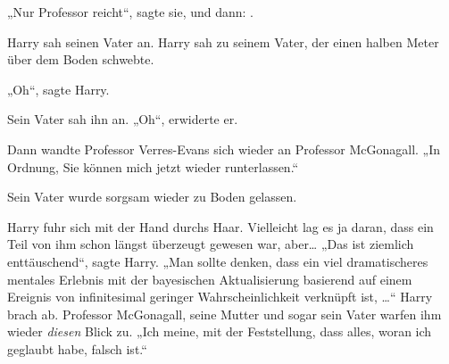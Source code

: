 „Nur Professor reicht“, sagte sie, und dann: .

Harry sah seinen Vater an.
Harry sah zu seinem Vater, der einen halben Meter über dem Boden schwebte.

„Oh“, sagte Harry.

Sein Vater sah ihn an. „Oh“, erwiderte er.

Dann wandte Professor Verres-Evans sich wieder an Professor McGonagall. „In Ordnung, Sie können mich jetzt wieder runterlassen.“

Sein Vater wurde sorgsam wieder zu Boden gelassen.

Harry fuhr sich mit der Hand durchs Haar. Vielleicht lag es ja daran, dass ein Teil von ihm schon längst überzeugt gewesen war, aber… „Das ist ziemlich enttäuschend“, sagte Harry. „Man sollte denken, dass ein viel dramatischeres mentales Erlebnis mit der bayesischen Aktualisierung basierend auf einem Ereignis von infinitesimal geringer Wahrscheinlichkeit verknüpft ist, …“ Harry brach ab. Professor McGonagall, seine Mutter und sogar sein Vater warfen ihm wieder \emph{diesen} Blick zu. „Ich meine, mit der Feststellung, dass alles, woran ich geglaubt habe, falsch ist.“

